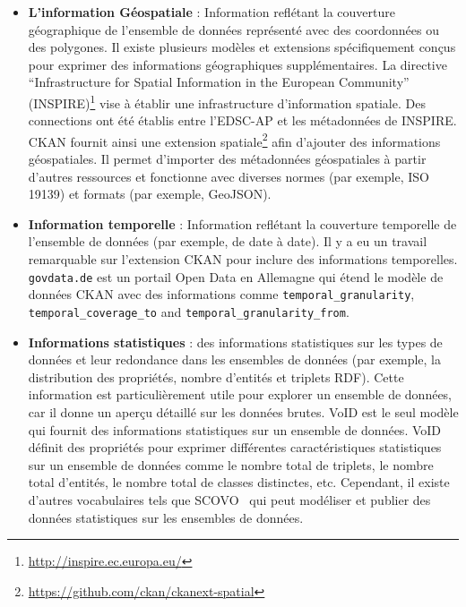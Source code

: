 \begin{itemize}
	\item \textbf{L'information G\'{e}ospatiale} : Information refl\'{e}tant la couverture g\'{e}ographique de l'ensemble de donn\'{e}es repr\'{e}sent\'{e} avec des coordonn\'{e}es ou des polygones. Il existe plusieurs mod\`{e}les et extensions sp\'{e}cifiquement conçus pour exprimer des informations g\'{e}ographiques suppl\'{e}mentaires. La directive ``Infrastructure for Spatial Information in the European Community'' (INSPIRE)\footnote{\url{http://inspire.ec.europa.eu/}} vise à \'{e}tablir une infrastructure d'information spatiale. Des connections ont \'{e}t\'{e} \'{e}tablis entre l'EDSC-AP et les m\'{e}tadonn\'{e}es de INSPIRE. CKAN fournit ainsi une extension spatiale\footnote{\url{https://github.com/ckan/ckanext-spatial}} afin d'ajouter des informations g\'{e}ospatiales. Il permet d'importer des m\'{e}tadonn\'{e}es g\'{e}ospatiales à partir d'autres ressources et fonctionne avec diverses normes (par exemple, ISO 19139) et formats (par exemple, GeoJSON).
	\item \textbf{Information temporelle} : Information refl\'{e}tant la couverture temporelle de l'ensemble de donn\'{e}es (par exemple, de date à date). Il y a eu un travail remarquable sur l'extension CKAN pour inclure des informations temporelles. \texttt{govdata.de} est un portail Open Data en Allemagne qui \'{e}tend le mod\`{e}le de donn\'{e}es CKAN avec des informations comme \texttt{temporal\_granularity}, \texttt{temporal\_coverage\_to} and \texttt{temporal\_granularity\_from}.
	\item \textbf{Informations statistiques} : des informations statistiques sur les types de donn\'{e}es et leur redondance dans les ensembles de donn\'{e}es (par exemple, la distribution des propri\'{e}t\'{e}s, nombre d'entit\'{e}s et triplets RDF). Cette information est particuli\`{e}rement utile pour explorer un ensemble de donn\'{e}es, car il donne un aperçu d\'{e}taill\'{e} sur les donn\'{e}es brutes. VoID est le seul mod\`{e}le qui fournit des informations statistiques sur un ensemble de donn\'{e}es. VoID d\'{e}finit des propri\'{e}t\'{e}s pour exprimer diff\'{e}rentes caract\'{e}ristiques statistiques sur un ensemble de donn\'{e}es comme le nombre total de triplets, le nombre total d'entit\'{e}s, le nombre total de classes distinctes, etc. Cependant, il existe d'autres vocabulaires tels que SCOVO~\cite{Hausenblas:ESWC:09} qui peut mod\'{e}liser et publier des donn\'{e}es statistiques sur les ensembles de donn\'{e}es.

\end{itemize}
